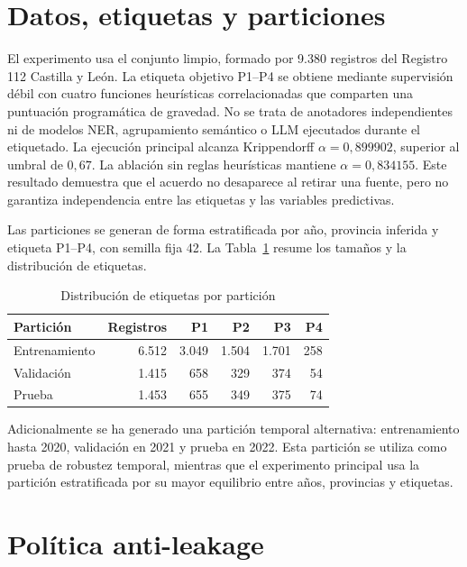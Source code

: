 \section{Datos, etiquetas y particiones}

El experimento usa el conjunto limpio, formado por 9.380 registros del Registro 112 Castilla y León. La etiqueta objetivo P1--P4 se
obtiene mediante supervisión débil con cuatro funciones heurísticas correlacionadas que comparten una puntuación programática de gravedad. No se trata de anotadores independientes ni de modelos NER, agrupamiento semántico o LLM ejecutados durante el etiquetado. La ejecución principal
alcanza Krippendorff \(\alpha = 0{,}899902\), superior al umbral de \(0{,}67\). La
ablación sin reglas heurísticas mantiene \(\alpha = 0{,}834155\). Este resultado
demuestra que el acuerdo no desaparece al retirar una fuente, pero no garantiza
independencia entre las etiquetas y las variables predictivas.

Las particiones se generan de forma estratificada por año, provincia inferida y etiqueta
P1--P4, con semilla fija 42. La Tabla~\ref{tab:9-splits} resume los tamaños y la
distribución de etiquetas.

\begin{table}[ht]
\centering
\caption{Distribución de etiquetas por partición}
\label{tab:9-splits}
\small
\begin{tabular}{|l|r|r|r|r|r|}
\hline
\textbf{Partición} & \textbf{Registros} & \textbf{P1} & \textbf{P2} & \textbf{P3} & \textbf{P4} \\ \hline
Entrenamiento & 6.512 & 3.049 & 1.504 & 1.701 & 258 \\ \hline
Validación & 1.415 & 658 & 329 & 374 & 54 \\ \hline
Prueba & 1.453 & 655 & 349 & 375 & 74 \\ \hline
\end{tabular}
\end{table}

Adicionalmente se ha generado una partición temporal alternativa: entrenamiento hasta 2020,
validación en 2021 y prueba en 2022. Esta partición se utiliza como prueba de robustez
temporal, mientras que el experimento principal usa la partición estratificada por su mayor
equilibrio entre años, provincias y etiquetas.

\section{Política anti-leakage}

